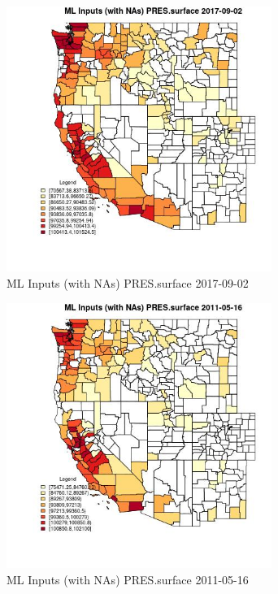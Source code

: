 \begin{figure} 
\centering  
\includegraphics[width=0.77\textwidth]{Code_Outputs/Report_ML_input_PM25_Step4_part_e_de_duplicated_aves_compiled_2019-05-21wNAs_CountyPRESsurfaceMean2017-09-02.jpg} 
\caption{\label{fig:Report_ML_input_PM25_Step4_part_e_de_duplicated_aves_compiled_2019-05-21wNAsCountyPRESsurfaceMean2017-09-02}ML Inputs (with NAs) PRES.surface 2017-09-02} 
\end{figure} 
 

\begin{figure} 
\centering  
\includegraphics[width=0.77\textwidth]{Code_Outputs/Report_ML_input_PM25_Step4_part_e_de_duplicated_aves_compiled_2019-05-21wNAs_CountyPRESsurfaceMean2011-05-16.jpg} 
\caption{\label{fig:Report_ML_input_PM25_Step4_part_e_de_duplicated_aves_compiled_2019-05-21wNAsCountyPRESsurfaceMean2011-05-16}ML Inputs (with NAs) PRES.surface 2011-05-16} 
\end{figure} 
 


